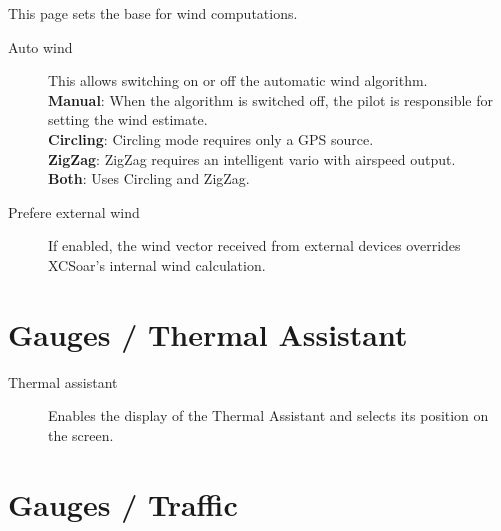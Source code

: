 This page sets the base for wind computations.

\begin{description}
\item[Auto wind]  \label{conf:autowind} This allows switching on or off the
  automatic wind algorithm. \\
  {\bf Manual}: When the algorithm is switched off, the pilot is responsible for
  setting the wind estimate. \\
  {\bf Circling}: Circling mode requires only a GPS source. \\
  {\bf ZigZag}: ZigZag requires an intelligent vario with airspeed output. \\
  {\bf Both}:  Uses Circling and ZigZag.
\item[Prefere external wind]  If enabled, the wind vector received from external
  devices overrides XCSoar's internal wind calculation.
\end{description}


\section{Gauges / Thermal Assistant}

\begin{description}
\item[Thermal assistant] \label{conf:thermalassistant} Enables the display of the
  Thermal Assistant and selects its position on the screen.
\end{description}


\section{Gauges / Traffic} \label{sec:flarmandother-gauge}

